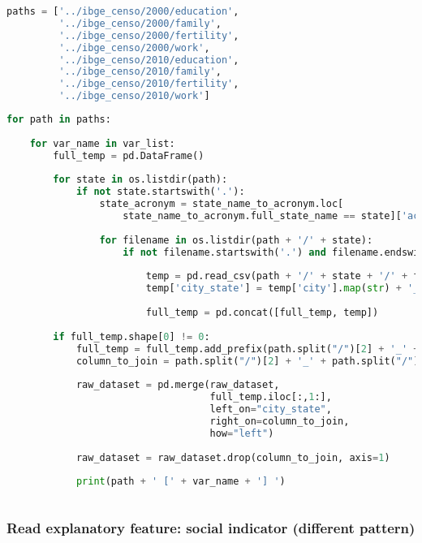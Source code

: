 \begin{lstlisting}[language=Python]
paths = ['../ibge_censo/2000/education',
         '../ibge_censo/2000/family',
         '../ibge_censo/2000/fertility',
         '../ibge_censo/2000/work',
         '../ibge_censo/2010/education',
         '../ibge_censo/2010/family',
         '../ibge_censo/2010/fertility',
         '../ibge_censo/2010/work']
\end{lstlisting}

\begin{lstlisting}[language=Python]
for path in paths:
    
    for var_name in var_list:
        full_temp = pd.DataFrame()
        
        for state in os.listdir(path):
            if not state.startswith('.'):
                state_acronym = state_name_to_acronym.loc[
                    state_name_to_acronym.full_state_name == state]['acronym'].values[0]
        
                for filename in os.listdir(path + '/' + state):
                    if not filename.startswith('.') and filename.endswith(var_name + '.csv'):
        
                        temp = pd.read_csv(path + '/' + state + '/' + filename)
                        temp['city_state'] = temp['city'].map(str) + '_' + state_acronym
                        
                        full_temp = pd.concat([full_temp, temp])
        
        if full_temp.shape[0] != 0:
            full_temp = full_temp.add_prefix(path.split("/")[2] + '_' + path.split("/")[3] + '_' + var_name + '_')
            column_to_join = path.split("/")[2] + '_' + path.split("/")[3] + '_' + var_name + '_city_state'
            
            raw_dataset = pd.merge(raw_dataset,
                                   full_temp.iloc[:,1:],
                                   left_on="city_state",
                                   right_on=column_to_join,
                                   how="left")
            
            raw_dataset = raw_dataset.drop(column_to_join, axis=1)
            
            print(path + ' [' + var_name + '] ')
        
\end{lstlisting}

\hypertarget{read-explanatory-feature-social-indicator-different-pattern}{%
\subsubsection{Read explanatory feature: social indicator (different
pattern)}\label{read-explanatory-feature-social-indicator-different-pattern}}

